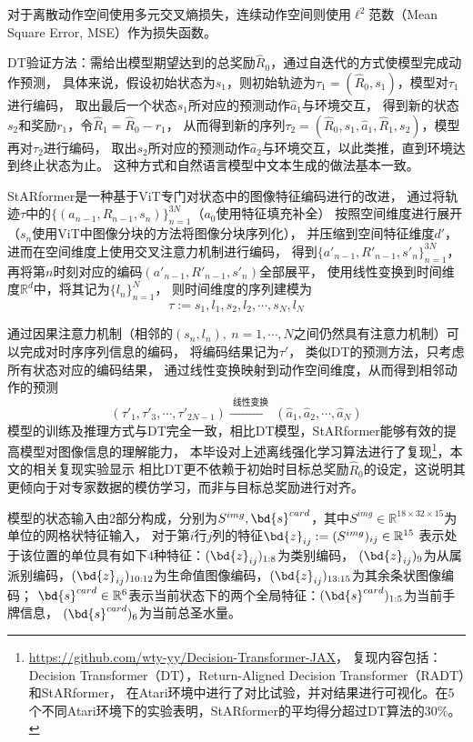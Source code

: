 对于离散动作空间使用多元交叉熵损失，连续动作空间则使用$\ell^2$范数（Mean Square Error, MSE）作为损失函数。

DT验证方法：需给出模型期望达到的总奖励$\hat{R}_0$，通过自迭代的方式使模型完成动作预测，
具体来说，假设初始状态为$s_1$，则初始轨迹为$\tau_1=(\hat{R}_0,s_1)$，模型对$\tau_1$进行编码，
取出最后一个状态$s_1$所对应的预测动作$\hat{a}_1$与环境交互，
得到新的状态$s_2$和奖励$r_1$，令$\hat{R}_1 = \hat{R}_0 - r_1$，
从而得到新的序列$\tau_2 = (\hat{R}_0,s_1,\hat{a}_1, \hat{R}_1, s_2)$，模型再对$\tau_2$进行编码，
取出$s_2$所对应的预测动作$\hat{a}_2$与环境交互，以此类推，直到环境达到终止状态为止。
这种方式和自然语言模型中文本生成的做法基本一致。

StARformer是一种基于ViT专门对状态中的图像特征编码进行的改进，
通过将轨迹$\tau$中的$\{(a_{n-1},R_{n-1},s_{n})\}_{n=1}^{3N}$（$a_0$使用特征填充补全）
按照空间维度进行展开（$s_{n}$使用ViT中图像分块的方法将图像分块序列化），
并压缩到空间特征维度$d'$，进而在空间维度上使用交叉注意力机制进行编码，
得到$\{a'_{n-1},R'_{n-1},s'_{n}\}_{n=1}^{3N}$，
再将第$n$时刻对应的编码$(a'_{n-1},R'_{n-1},s'_{n})$全部展平，
使用线性变换到时间维度$\mathbb{R}^d$中，将其记为$\{l_{n}\}_{n=1}^N$，
则时间维度的序列建模为
\begin{equation}
  \tau:=s_1,l_1,s_2,l_2,\cdots,s_N,l_N
\end{equation}

通过因果注意力机制（相邻的$(s_n,l_n),~n=1,\cdots,N$之间仍然具有注意力机制）可以完成对时序序列信息的编码，
将编码结果记为$\tau'$，
类似DT的预测方法，只考虑所有状态对应的编码结果，
通过线性变换映射到动作空间维度，从而得到相邻动作的预测
\begin{equation}
  (\tau'_1,\tau'_3,\cdots, \tau'_{2N-1})\xrightarrow{\text{~线性变换~}}
  (\hat{a}_1,\hat{a}_2,\cdots, \hat{a}_{N})
\end{equation}
模型的训练及推理方式与DT完全一致，相比DT模型，StARformer能够有效的提高模型对图像信息的理解能力，
本毕设对上述离线强化学习算法进行了复现\footnote{\url{https://github.com/wty-yy/Decision-Transformer-JAX}，
复现内容包括：Decision Transformer（DT），Return-Aligned Decision Transformer（RADT）和StARformer，
在Atari环境中进行了对比试验，并对结果进行可视化。在5个不同Atari环境下的实验表明，StARformer的平均得分超过DT算法的$30\%$。}，本文的相关复现实验显示
相比DT更不依赖于初始时目标总奖励$\hat{R}_0$的设定，这说明其更倾向于对专家数据的模仿学习，而非与目标总奖励进行对齐。

\label{sec-model}
模型的状态输入由2部分构成，分别为$S^{img}, \bd{s}^{card}$，其中$S^{img}\in\mathbb{R}^{18\times 32\times 15}$为单位的网格状特征输入，
对于第$i$行$j$列的特征$\bd{z}_{ij}:=(S^{img})_{ij}\in\mathbb{R}^{15}$
表示处于该位置的单位具有如下$4$种特征：$(\bd{z}_{ij})_{1:8}$为类别编码，
$(\bd{z}_{ij})_9$为从属派别编码，$(\bd{z}_{ij})_{10:12}$为生命值图像编码，$(\bd{z}_{ij})_{13:15}$为其余条状图像编码；
$\bd{s}^{card}\in\mathbb{R}^6$表示当前状态下的两个全局特征：$(\bd{s}^{card})_{1:5}$为当前手牌信息，
$(\bd{s}^{card})_6$为当前总圣水量。

